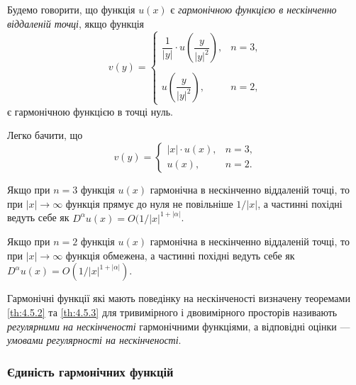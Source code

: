 \begin{definition}
	Будемо говорити, що функція $u(x)$ є \textit{гармонічною функцією в нескінченно віддаленій точці}, якщо функція 
	\begin{equation}
		v(y) = \begin{cases}
			\dfrac{1}{|y|} \cdot u \left( \dfrac{y}{|y|^2} \right), & n = 3, \\ & \\
			u \left( \dfrac{y}{|y|^2} \right), & n = 2,
		\end{cases}
	\end{equation}
	є гармонічною функцією в точці нуль.
\end{definition}

Легко бачити, що
\begin{equation}
	v(y) = \begin{cases}
		|x| \cdot u(x), & n = 3, \\
		u(x), & n = 2.
	\end{cases}
\end{equation}

\begin{theorem}
	\label{th:4.5.2}
	Якщо при $n = 3$ функція $u(x)$ гармонічна в нескінченно віддаленій точці, то при $|x| \to \infty$ функція прямує до нуля не повільніше $1/|x|$, а частинні похідні ведуть себе як $D^\alpha u(x) = O (1 / |x|^{1 + |\alpha|}$.
\end{theorem}

\begin{theorem}
	\label{th:4.5.3}
	Якщо при $n = 2$ функція $u(x)$ гармонічна в нескінченно віддаленій точці, то при $|x| \to \infty$ функція  обмежена, а частинні похідні ведуть себе як $D^\alpha u(x) = O (1 / |x|^{1 + |\alpha|} )$.
\end{theorem}

\begin{definition}
	Гармонічні функції які мають поведінку на нескінченості визначену теоремами \ref{th:4.5.2} та \ref{th:4.5.3} для тривимірного і двовимірного просторів називають \textit{регулярними на нескінченості} гармонічними функціями, а відповідні оцінки --- \textit{умовами регулярності на нескінченості}.
\end{definition}

\subsubsection{Єдиність гармонічних функцій}

